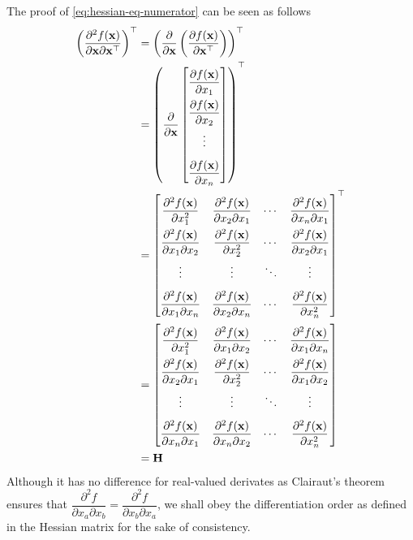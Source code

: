 \documentclass{article}
\begin{document}
The proof of \eqref{eq:hessian-eq-numerator} can be seen as follows
\begin{align}
    \left( \dfrac{\partial^{2} f(\mathbf{x})}{\partial \mathbf{x} \partial \mathbf{x}^\top} \right)^\top & = \left( \dfrac{\partial }{\partial \mathbf{x}}\left( \dfrac{\partial f(\mathbf{x})}{\partial \mathbf{x}^\top} \right) \right)^\top \\
    & = \left( \dfrac{\partial }{\partial \mathbf{x}} \begin{bmatrix}
        \dfrac{\partial f(\mathbf{x})}{\partial x_1}\\
        \dfrac{\partial f(\mathbf{x})}{\partial x_2}\\
        \vdots\\
        \dfrac{\partial f(\mathbf{x})}{\partial x_n}
    \end{bmatrix} \right)^\top\\
    & = \renewcommand{\arraystretch}{2.2}\begin{bmatrix}
        \dfrac{\partial^2 f(\mathbf{x})}{\partial x_1^2} & \dfrac{\partial^2 f(\mathbf{x})}{\partial x_2\partial x_1} & \cdots & \dfrac{\partial^2 f(\mathbf{x})}{\partial x_n\partial x_1}\\
        \dfrac{\partial^2 f(\mathbf{x})}{\partial x_1\partial x_2} & \dfrac{\partial^2 f(\mathbf{x})}{\partial x_2^2} & \cdots & \dfrac{\partial^2 f(\mathbf{x})}{\partial x_2\partial x_1}\\
        \vdots&\vdots& \ddots&\vdots\\
        \dfrac{\partial^2 f(\mathbf{x})}{\partial x_1\partial x_n} & \dfrac{\partial^2 f(\mathbf{x})}{\partial x_2\partial x_n} & \cdots & \dfrac{\partial^2 f(\mathbf{x})}{\partial x_n^2}\\
    \end{bmatrix}^\top \\
    & = \renewcommand{\arraystretch}{2.2}\begin{bmatrix}
        \dfrac{\partial^2 f(\mathbf{x})}{\partial x_1^2} & \dfrac{\partial^2 f(\mathbf{x})}{\partial x_1\partial x_2} & \cdots & \dfrac{\partial^2 f(\mathbf{x})}{\partial x_1\partial x_n}\\
        \dfrac{\partial^2 f(\mathbf{x})}{\partial x_2\partial x_1} & \dfrac{\partial^2 f(\mathbf{x})}{\partial x_2^2} & \cdots & \dfrac{\partial^2 f(\mathbf{x})}{\partial x_1\partial x_2}\\
        \vdots&\vdots& \ddots&\vdots\\
        \dfrac{\partial^2 f(\mathbf{x})}{\partial x_n\partial x_1} & \dfrac{\partial^2 f(\mathbf{x})}{\partial x_n\partial x_2} & \cdots & \dfrac{\partial^2 f(\mathbf{x})}{\partial x_n^2}\\
    \end{bmatrix} \\
    & = \mathbf{H}
\end{align}
Although it has no difference for real-valued derivates as Clairaut's theorem ensures that \cite{stewart2020calculus} \(\dfrac{\partial^{2} f}{\partial x_a \partial x_b} = \dfrac{\partial^{2} f}{\partial x_b \partial x_a}\), we shall obey the differentiation order as defined in the Hessian matrix for the sake of consistency.
\end{document}

